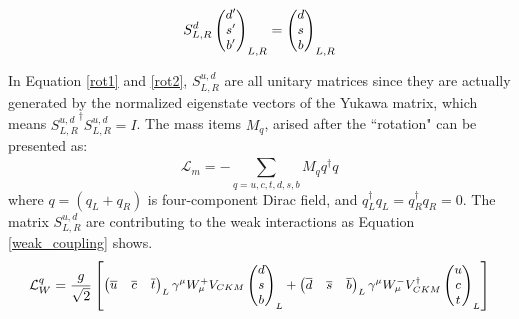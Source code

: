 \begin{equation}\label{rot2}
\small
S_{L,R}^{d}
\begin{pmatrix}
d^\prime   \\
s^\prime  \\
b^\prime 
\end{pmatrix}_{L,R}
= \begin{pmatrix}
d  \\
s  \\
b 
\end{pmatrix}_{L,R}
\end{equation}


 In Equation \ref{rot1} and \ref{rot2}, $S^{u,d}_{L,R}$ are all unitary matrices since they are actually generated by the normalized eigenstate vectors of the Yukawa matrix, which means ${S_{L,R}^{u,d}}^\dag S_{L,R}^{u,d} = I$. The mass
  items $M_q$, arised after the ``rotation" can be presented as: 
\begin{equation}
\mathcal{L}_{m} = -\sum_{q=u,c,t,d,s,b}^{} M_q q^{\dag}_{} q_{}
\end{equation}
where $q=(q_L+q_R)$ is four-component Dirac field, and $q_L^\dag q_L = q_R^\dag q_R = 0$. The matrix $S^{u,d}_{L,R}$ are contributing to the weak interactions as Equation \ref{weak_coupling} shows.
\begin{equation}\label{weak_coupling}
\small
\mathcal{L}^q_W = \frac{g}{\sqrt{2}}
\begin{bmatrix}
\begin{pmatrix}
\overline{u}&\overline{c}&\overline{t}
\end{pmatrix}_L

\gamma^\mu W^{+}_{\mu}
V_{CKM}
\begin{pmatrix}
d\\s\\b\\
\end{pmatrix}_L+
\begin{pmatrix}
\overline{d}&\overline{s}&\overline{b}
\end{pmatrix}_L
\gamma^\mu W^{-}_{\mu}
V_{CKM}^{\dag}
\begin{pmatrix}
u\\c\\t\\
\end{pmatrix}_L
\end{bmatrix}
\end{equation}


